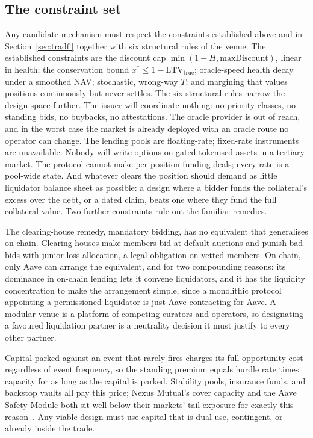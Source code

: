 \documentclass[11pt,a4paper]{article}
\begin{document}
\subsection{The constraint set}

Any candidate mechanism must respect the constraints established above and in Section~\ref{sec:tradfi} together with six structural rules of the venue. The established constraints are the discount cap $\min(1-H, \text{maxDiscount})$, linear in health; the conservation bound $x^* \le 1 - \mathrm{LTV}_{\text{true}}$; oracle-speed health decay under a smoothed NAV; stochastic, wrong-way $T$; and margining that values positions continuously but never settles. The six structural rules narrow the design space further. The issuer will coordinate nothing: no priority classes, no standing bids, no buybacks, no attestations. The oracle provider is out of reach, and in the worst case the market is already deployed with an oracle route no operator can change. The lending pools are floating-rate; fixed-rate instruments are unavailable. Nobody will write options on gated tokenised assets in a tertiary market. The protocol cannot make per-position funding deals; every rate is a pool-wide state. And whatever clears the position should demand as little liquidator balance sheet as possible: a design where a bidder funds the collateral's excess over the debt, or a dated claim, beats one where they fund the full collateral value. Two further constraints rule out the familiar remedies.

The clearing-house remedy, mandatory bidding, has no equivalent that generalises on-chain. Clearing houses make members bid at default auctions and punish bad bids with junior loss allocation, a legal obligation on vetted members. On-chain, only Aave can arrange the equivalent, and for two compounding reasons: its dominance in on-chain lending lets it convene liquidators, and it has the liquidity concentration to make the arrangement simple, since a monolithic protocol appointing a permissioned liquidator is just Aave contracting for Aave. A modular venue is a platform of competing curators and operators, so designating a favoured liquidation partner is a neutrality decision it must justify to every other partner.

Capital parked against an event that rarely fires charges its full opportunity cost regardless of event frequency, so the standing premium equals hurdle rate times capacity for as long as the capital is parked. Stability pools, insurance funds, and backstop vaults all pay this price; Nexus Mutual's cover capacity and the Aave Safety Module both sit well below their markets' tail exposure for exactly this reason~\cite{nexus, aavedocs}. Any viable design must use capital that is dual-use, contingent, or already inside the trade.
\end{document}
